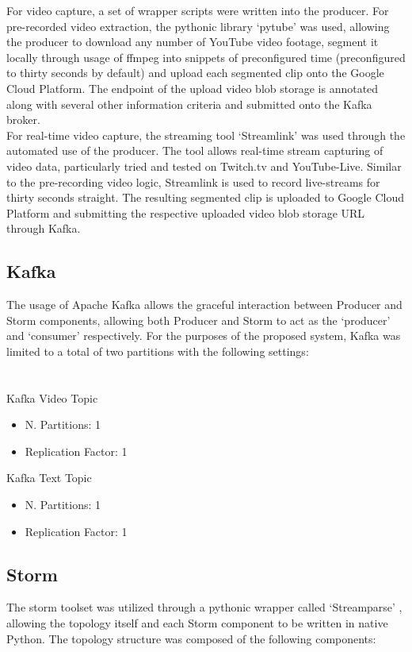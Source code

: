 \documentclass[10pt,conference]{IEEEtran}
\begin{document}
For video capture, a set of wrapper scripts were written into the producer. For pre-recorded video extraction, the pythonic library ‘pytube’ \cite{PyTube} was used, allowing the producer to download any number of YouTube video footage, segment it locally through usage of ffmpeg \cite{Ffmpeg} into snippets of preconfigured time (preconfigured to thirty seconds by default) and upload each segmented clip onto the Google Cloud Platform. The endpoint of the upload video blob storage is annotated along with several other information criteria and submitted onto the Kafka broker.
\\
For real-time video capture, the streaming tool ‘Streamlink’ \cite{Streamlink} was used through the automated use of the producer. The tool allows real-time stream capturing of video data, particularly tried and tested on Twitch.tv and YouTube-Live. Similar to the pre-recording video logic, Streamlink is used to record live-streams for thirty seconds straight. The resulting segmented clip is uploaded to Google Cloud Platform and submitting the respective uploaded video blob storage URL through Kafka.

\subsection{Kafka}
The usage of Apache Kafka allows the graceful interaction between Producer and Storm components, allowing both Producer and Storm to act as the ‘producer’ and ‘consumer’ respectively. For the purposes of the proposed system, Kafka was limited to a total of two partitions with the following settings:
\\
\\
\\
Kafka Video Topic
\begin{itemize}
    \item N. Partitions: 1
    \item Replication Factor: 1
\end{itemize}
Kafka Text Topic

\begin{itemize}
    \item N. Partitions: 1
    \item Replication Factor: 1
\end{itemize}

\subsection{Storm}
The storm toolset was utilized through a pythonic wrapper called ‘Streamparse’ \cite{Streamparse}, allowing the topology itself and each Storm component to be written in native Python. The topology structure was composed of the following components:
\end{document}
